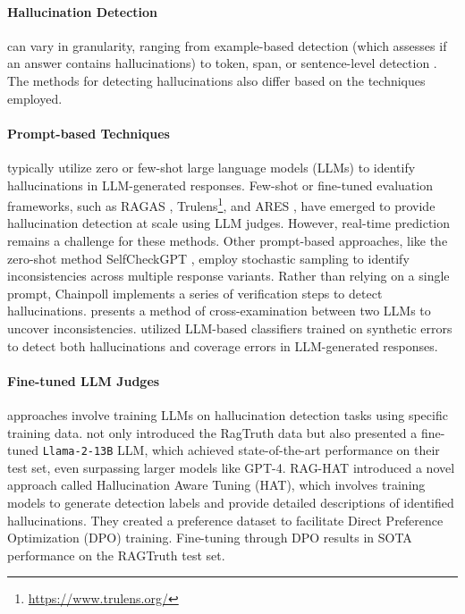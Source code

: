 \paragraph{Hallucination Detection} can vary in granularity, ranging from example-based detection (which assesses if an answer contains hallucinations) to token, span, or sentence-level detection \cite{Niu:2024}. The methods for detecting hallucinations also differ based on the techniques employed.

\paragraph{Prompt-based Techniques} typically utilize zero or few-shot large language models (LLMs) to identify hallucinations in LLM-generated responses. Few-shot or fine-tuned evaluation frameworks, such as RAGAS \cite{Es:2024}, Trulens\footnote{\url{https://www.trulens.org/}}, and ARES \cite{SaadFalcon:2024}, have emerged to provide hallucination detection at scale using LLM judges. However, real-time prediction remains a challenge for these methods. Other prompt-based approaches, like the zero-shot method SelfCheckGPT \cite{Manakul:2023}, employ stochastic sampling to identify inconsistencies across multiple response variants. Rather than relying on a single prompt, Chainpoll \cite{Friel:2023} implements a series of verification steps to detect hallucinations. \citet{Cohen:2023} presents a method of cross-examination between two LLMs to uncover inconsistencies. \citet{Chang:2024} utilized LLM-based classifiers trained on synthetic errors to detect both hallucinations and coverage errors in LLM-generated responses.

\paragraph{Fine-tuned LLM Judges} approaches involve training LLMs on hallucination detection tasks using specific training data. \citet{Niu:2024} not only introduced the RagTruth data but also presented a fine-tuned \texttt{Llama-2-13B} LLM, which achieved state-of-the-art performance on their test set, even surpassing larger models like GPT-4. RAG-HAT \cite{Song:2024} introduced a novel approach called Hallucination Aware Tuning (HAT), which involves training models to generate detection labels and provide detailed descriptions of identified hallucinations. They created a preference dataset to facilitate Direct Preference Optimization (DPO) training. Fine-tuning through DPO results in SOTA performance on the RAGTruth test set.

